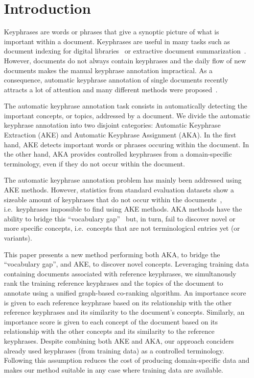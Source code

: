 \section{Introduction}
\label{sec: introduction}
  Keyphrases are words or phrases that give a synoptic picture of what is
  important within a document. Keyphrases are useful in many tasks such as
  document indexing for digital
  libraries~\cite{gutwin1999keyphrasesfordigitallibraries} or extractive
  document summarization~\cite{litvak2008graphbased}. However, documents do not
  always contain keyphrases and the daily flow of new documents makes the manual
  keyphrase annotation impractical. As a consequence, automatic keyphrase
  annotation of single documents recently attracts a lot of attention and many
  different methods were proposed~\cite{hasan2014state_of_the_art}.

  The automatic keyphrase annotation task consists in automatically detecting
  the important concepts, or topics, addressed by a document. We divide the
  automatic keyphrase annotation into two disjoint categories: Automatic
  Keyphrase Extraction (AKE) and Automatic Keyphrase Assignment (AKA). In the
  first hand, AKE detects important words or phrases occuring within the
  document. In the other hand, AKA provides controlled keyphrases from a
  domain-specific terminology, even if they do not occur within the document.

  The automatic keyphrase annotation problem has mainly been addressed using AKE
  methods. However, statistics from standard evaluation datasets show a sizeable
  amount of keyphrases that do not occur within the
  documents~\cite{bougouin2013topicrank}, i.e.~keyphrases impossible to find
  using AKE methods. AKA methods have the ability to bridge this ``vocabulary
  gap''~\cite{liu2011vocabularygap} but, in turn, fail to discover novel or more
  specific concepts, i.e.~concepts that are not terminological entries yet (or
  variants).

  This paper presents a new method performing both AKA, to bridge the
  ``vocabulary gap'', and AKE, to discover novel concepts. Leveraging training
  data containing documents associated with reference keyphrases, we
  simultanously rank the training reference keyphrases and the topics of the
  document to annotate using a unified graph-based co-ranking algorithm. An
  importance score is given to each reference keyphrase based on its
  relationship with the other reference keyphrases and its similarity to the
  document's concepts. Similarly, an importance score is given to each concept
  of the document based on its relationship with the other concepts and its
  similarity to the reference keyphrases. Despite combining both AKE and AKA,
  our approach conciders already used keyphrases (from training data) as a
  controlled terminology. Following this assumption reduces the cost of
  producing domain-specific data and makes our method suitable in any case where
  training data are available.

